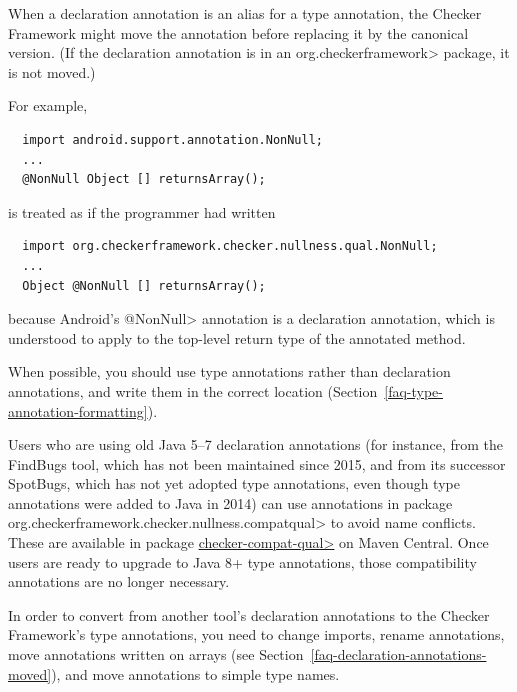 \label{declaration-annotations-moved} %

When a declaration annotation is an alias for a type annotation, the
Checker Framework might move the annotation before replacing it by the
canonical version. (If the declaration annotation is in an \<org.checkerframework>
package, it is not moved.)

For example,

\begin{Verbatim}
  import android.support.annotation.NonNull;
  ...
  @NonNull Object [] returnsArray();
\end{Verbatim}

\noindent
is treated as if the programmer had written

\begin{Verbatim}
  import org.checkerframework.checker.nullness.qual.NonNull;
  ...
  Object @NonNull [] returnsArray();
\end{Verbatim}

\noindent
because Android's \<@NonNull> annotation is a declaration annotation, which
is understood to apply to the top-level return type of the annotated method.

When possible, you should use type annotations rather than declaration
annotations, and write them in the correct location
(Section~\ref{faq-type-annotation-formatting}).

Users who are using old Java 5--7 declaration annotations (for instance,
from the FindBugs tool, which has not been maintained since 2015, and from
its successor SpotBugs, which has not yet adopted type annotations, even
though type annotations were added to Java in 2014) can use annotations in
package \<org.checkerframework.checker.nullness.compatqual> to avoid name
conflicts.  These are available in package
\href{https://central.sonatype.com/search?q=a:checker-compat-qual}{\<checker-compat-qual>}
on Maven Central.  Once users are ready to upgrade to Java 8+ type
annotations, those compatibility annotations are no longer necessary.



In order to convert from another tool's declaration annotations to the Checker Framework's type annotations,
you need to change imports, rename annotations, move annotations written on arrays (see Section~\ref{faq-declaration-annotations-moved}), and move annotations to simple type names.

